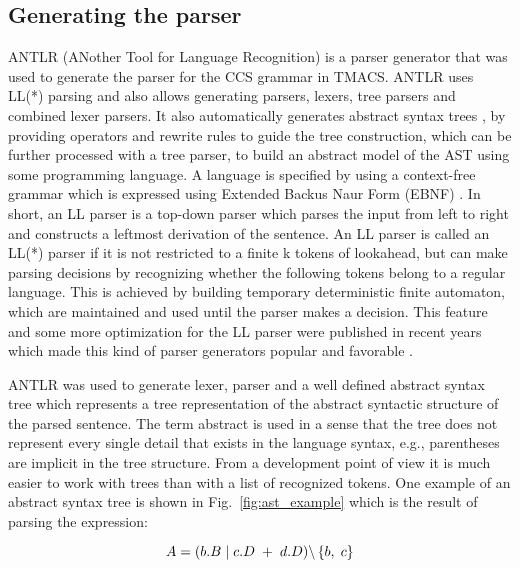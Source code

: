 \subsection{Generating the parser}
ANTLR (ANother Tool for Language Recognition) \cite{ANTLR} is a parser generator that was used 
to generate the parser for the CCS grammar in TMACS. ANTLR uses LL(*) parsing and also allows generating 
parsers, lexers, tree parsers and combined lexer parsers. It also automatically generates 
abstract syntax trees \cite{Compilers}, by providing operators and rewrite rules to guide the tree construction,
which can be further processed with a tree parser, to build an abstract model of the AST using some programming language.
A language is specified by using a context-free grammar which is expressed using Extended Backus Naur Form (EBNF) 
\cite{Compilers}. In short, an LL parser is a top-down parser which parses the input from left to right and constructs 
a leftmost derivation of the sentence. An LL parser is called an LL(*) parser if it is not restricted to a finite k 
tokens of lookahead, but can make parsing decisions by recognizing whether the following tokens
belong to a regular language. This is achieved by building temporary deterministic finite
automaton, which are maintained and used until the parser makes a decision. This feature and
some more optimization for the LL parser were published in recent years which made this kind 
of parser generators popular and favorable \cite{Compilers}.

ANTLR was used to generate lexer, parser and a well defined abstract syntax tree which represents a tree representation 
of the abstract syntactic structure of the parsed sentence. The term abstract is used in a sense 
that the tree does not represent every single detail that exists in the language syntax, 
e.g., parentheses are implicit in the tree structure. From a development point of view it is 
much easier to work with trees than with a list of recognized tokens. One example of an abstract syntax tree
is shown in Fig.~\ref{fig:ast_example} which is the result of parsing the expression: 

\begin{equation}\label{eq:ccs_example}
 A=( b.B \hspace{1 mm} | \hspace{1 mm} c.D \hspace{1 mm} + \hspace{1 mm} d.D )
\backslash \left\lbrace b, \hspace{1 mm} c \right\rbrace 
\end{equation}

